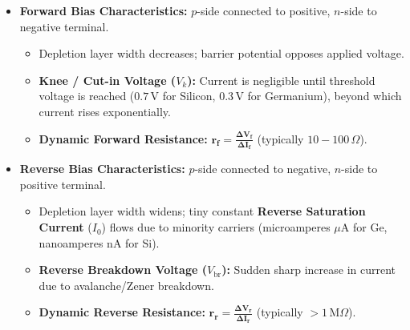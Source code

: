 \documentclass[10pt,a4paper]{article}
\begin{document}
\begin{conceptbox}
\begin{itemize}
  \item \textbf{Forward Bias Characteristics:} $p$-side connected to positive, $n$-side to negative terminal.
  \begin{itemize}
    \item Depletion layer width decreases; barrier potential opposes applied voltage.
    \item \textbf{Knee / Cut-in Voltage ($V_k$):} Current is negligible until threshold voltage is reached ($\mathbf{0.7\,\mathrm{V}}$ for Silicon, $\mathbf{0.3\,\mathrm{V}}$ for Germanium), beyond which current rises exponentially.
    \item \textbf{Dynamic Forward Resistance:} $\mathbf{r_f = \frac{\Delta V_f}{\Delta I_f}}$ (typically $10-100\,\Omega$).
  \end{itemize}
  \item \textbf{Reverse Bias Characteristics:} $p$-side connected to negative, $n$-side to positive terminal.
  \begin{itemize}
    \item Depletion layer width widens; tiny constant \textbf{Reverse Saturation Current} ($I_0$) flows due to minority carriers (microamperes $\mu\mathrm{A}$ for Ge, nanoamperes $\mathrm{nA}$ for Si).
    \item \textbf{Reverse Breakdown Voltage ($V_{\mathrm{br}}$):} Sudden sharp increase in current due to avalanche/Zener breakdown.
    \item \textbf{Dynamic Reverse Resistance:} $\mathbf{r_r = \frac{\Delta V_r}{\Delta I_r}}$ (typically $> 1\,\mathrm{M}\Omega$).
  \end{itemize}
\end{itemize}
\end{conceptbox}
\end{document}
